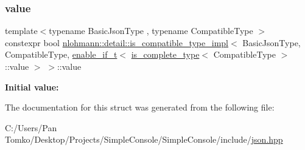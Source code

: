 \subsubsection{\texorpdfstring{value}{value}}
{\footnotesize\ttfamily template$<$typename Basic\+Json\+Type , typename Compatible\+Type $>$ \\
constexpr bool \mbox{\hyperlink{structnlohmann_1_1detail_1_1is__compatible__type__impl}{nlohmann\+::detail\+::is\+\_\+compatible\+\_\+type\+\_\+impl}}$<$ Basic\+Json\+Type, Compatible\+Type, \mbox{\hyperlink{namespacenlohmann_1_1detail_a02bcbc878bee413f25b985ada771aa9c}{enable\+\_\+if\+\_\+t}}$<$ \mbox{\hyperlink{structnlohmann_1_1detail_1_1is__complete__type}{is\+\_\+complete\+\_\+type}}$<$ Compatible\+Type $>$\+::value $>$ $>$\+::value\hspace{0.3cm}{\ttfamily [static]}}

{\bfseries Initial value\+:}
\begin{DoxyCode}{0}
\DoxyCodeLine{=}

\end{DoxyCode}


The documentation for this struct was generated from the following file\+:\begin{DoxyCompactItemize}
\item 
C\+:/\+Users/\+Pan Tomko/\+Desktop/\+Projects/\+Simple\+Console/\+Simple\+Console/include/\mbox{\hyperlink{json_8hpp}{json.\+hpp}}\end{DoxyCompactItemize}
